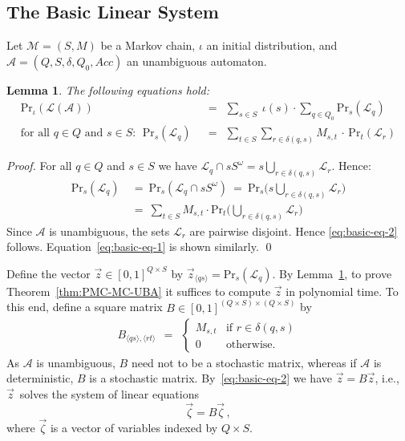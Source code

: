 \documentclass{elsarticle}
\newtheorem{lemma}[definition]{Lemma}
\def\<{\langle}
\def\>{\rangle}
\def\cA{\mathcal{A}}
\def\cL{\mathcal{L}}
\def\cM{\mathcal{M}}
\def\Pr{\mathrm{Pr}}
\def\Acc{\mathit{Acc}}
\begin{document}
\subsection{The Basic Linear System} \label{sub:linear-system}

Let $\cM = (S,M)$ be a Markov chain, $\iota$ an initial distribution,
and $\cA = (Q,S,\delta,Q_0,\Acc)$ an unambiguous automaton.
\begin{lemma} \label{lem:basic-eq}
The following equations hold:
\begin{align}
\Pr_\iota( \cL(\cA))
\ \  &=  \ \
\sum_{s\in S} \ \iota(s) \cdot \sum_{q\in Q_0} \Pr_s(\cL_q)  \label{eq:basic-eq-1} \\
\text{for all }q \in Q \text{ and } s \in S : \ \ \Pr_s(\cL_q)
\ \ &= \ \
\sum_{t\in S} \sum_{r \in \delta(q,s)} M_{s,t}\, \cdot\, \Pr_t(\cL_r) \label{eq:basic-eq-2}
\end{align}
\end{lemma}
\begin{proof}
For all $q \in Q$ and $s \in S$ we have
$
\cL_q \cap s S^\omega
= s \bigcup_{r \in \delta(q,s)} \cL_r
$.
Hence:
\begin{align*}
\Pr_s(\cL_q)
&\ = \ \Pr_s(\cL_q \cap s S^\omega)
\ = \ \Pr_s\Big(s \bigcup_{r \in \delta(q,s)} \cL_r\Big) \\
&\ = \ \sum_{t \in S} M_{s,t} \cdot \Pr_t\Big(\bigcup_{r \in \delta(q,s)}\cL_r\Big)
\end{align*}
Since $\cA$ is unambiguous, the sets $\cL_r$ are pairwise disjoint.
Hence \eqref{eq:basic-eq-2} follows.
Equation~\eqref{eq:basic-eq-1} is shown similarly.
\qed
\end{proof}


Define the vector $\vec{z} \in [0,1]^{Q \times S}$ by
$\vec{z}_{\<q s\>} = \Pr_s(\cL_q)$.  By
Lemma~\ref{lem:basic-eq}, to prove
Theorem~\ref{thm:PMC-MC-UBA} it suffices to compute $\vec{z}$ in
polynomial time.  To this end, define a square matrix
$B \in [0,1]^{(Q \times S) \times (Q \times S)}$ by
\begin{gather}
 B_{\<q s\>,\<r t\>}
   \ \ = \ \
  \begin{cases}
     M_{s,t} & \text{if } r\in \delta(q,s) \\[0.5ex]
     0 & \text{otherwise.}
  \end{cases}
\label{eq:defB}
\end{gather}
As $\cA$ is unambiguous, $B$ need not to be a stochastic matrix, whereas if
$\cA$ is deterministic, $B$ is a stochastic matrix.
By~\eqref{eq:basic-eq-2} we have $\vec{z} = B \vec{z}$, i.e., $\vec{z}$~solves the system of linear equations
\begin{equation}
 \vec{\zeta} = B \vec{\zeta}\,, \label{eq:basic-eq-2-matrix}
\end{equation}
where $\vec{\zeta}$ is a vector of variables indexed by $Q \times S$.
\end{document}
